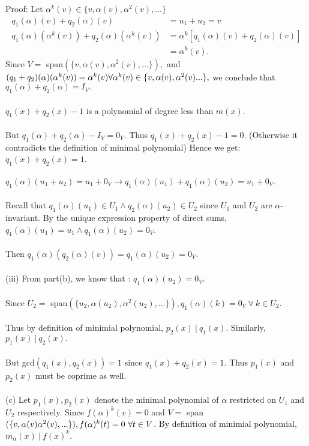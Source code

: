 \documentclass{article}
\begin{document}
Proof: Let $\alpha^k(v) \in \{v,\alpha(v),\alpha^2(v),...\}$\begin{align*}
q_1(\alpha)(v) + q_2(\alpha)(v) &= u_1 + u_2 = v\\ q_1(\alpha)(\alpha^k(v)) + q_2(\alpha)(\alpha^k(v)) &= \alpha^k[q_1(\alpha)(v) + q_2(\alpha)(v)] \\ &= \alpha^k(v).
\end{align*}
Since $V = $ span$(\{v,\alpha(v),\alpha^2(v),...\}),$ and $(q_1+q_2)(\alpha)(\alpha^k(v)) = \alpha^k(v)\\ \forall \alpha^k(v) \in \{v,\alpha(v),\alpha^2(v)...\},$ we conclude that $q_1(\alpha) + q_2(\alpha) = I_V.$\\\\
$q_1(x) + q_2(x) - 1$ is a polynomial of degree less than $m(x).$\\\\
But $q_1(\alpha) + q_2(\alpha) - I_V = 0_V.$ Thus $q_1(x) + q_2(x) - 1 = 0$. (Otherwise it contradicts the definition of minimal polynomial) Hence we get: $q_1(x) + q_2(x) = 1$.\\\\
$q_1(\alpha)(u_1+u_2) = u_1 + 0_V \to q_1(\alpha)(u_1) + q_1(\alpha)(u_2) = u_1 + 0_V.$\\\\ Recall that $q_1(\alpha)(u_1) \in U_1 \land q_2(\alpha)(u_2) \in U_2$ since $U_1$ and $U_2$ are $\alpha$-invariant. By the unique expression property of direct sums, $q_1(\alpha)(u_1) = u_1 \land q_1(\alpha)(u_2) = 0_V$.\\\\Then $
q_1(\alpha)(q_2(\alpha)(v)) = q_1(\alpha)(u_2) = 0_V$.\\\\
(iii) From part(b), we know that : $q_1(\alpha)(u_2) = 0_V.$\\\\ Since $U_2 = $ span$(\{u_2,\alpha(u_2),\alpha^2(u_2),...\}), q_1(\alpha)(k) = 0_V\ \forall\  k\in U_2$.\\\\
Thus by definition of minimial polynomial, $p_2(x)\ |\ q_1(x).$ Similarly, $p_1(x)\ |\ q_2(x).$\\\\ But gcd$(q_1(x),q_2(x))= 1$ since $q_1(x) + q_2(x) = 1$. Thus $p_1(x)$ and $p_2(x)$ must be coprime as well.\\\\
(c) Let $p_1(x),p_2(x)$ denote the minimal polynomial of $\alpha$ restricted on $U_1$ and $U_2$ respectively. Since $f(\alpha)^k(v) = 0$ and $V =$ span$(\{v,\alpha(v)\alpha^2(v),...\}), \\ f(\alpha)^k(t) = 0\ \forall t\in V$. By definition of minimial polynomial, $m_\alpha(x)\ |\ f(x)^k.$\\\\
\end{document}
